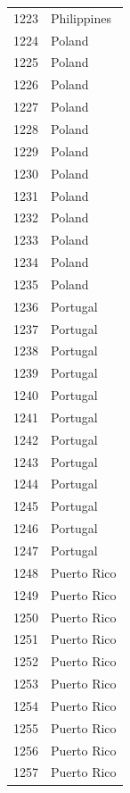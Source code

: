 \documentclass[
  letterpaper,
  DIV=11,
  numbers=noendperiod]{scrreprt}
\begin{document}
\begin{tabular}{ll}
1223 &               Philippines \\
1224 &                    Poland \\
1225 &                    Poland \\
1226 &                    Poland \\
1227 &                    Poland \\
1228 &                    Poland \\
1229 &                    Poland \\
1230 &                    Poland \\
1231 &                    Poland \\
1232 &                    Poland \\
1233 &                    Poland \\
1234 &                    Poland \\
1235 &                    Poland \\
1236 &                  Portugal \\
1237 &                  Portugal \\
1238 &                  Portugal \\
1239 &                  Portugal \\
1240 &                  Portugal \\
1241 &                  Portugal \\
1242 &                  Portugal \\
1243 &                  Portugal \\
1244 &                  Portugal \\
1245 &                  Portugal \\
1246 &                  Portugal \\
1247 &                  Portugal \\
1248 &               Puerto Rico \\
1249 &               Puerto Rico \\
1250 &               Puerto Rico \\
1251 &               Puerto Rico \\
1252 &               Puerto Rico \\
1253 &               Puerto Rico \\
1254 &               Puerto Rico \\
1255 &               Puerto Rico \\
1256 &               Puerto Rico \\
1257 &               Puerto Rico \\

\end{tabular}
\end{document}
